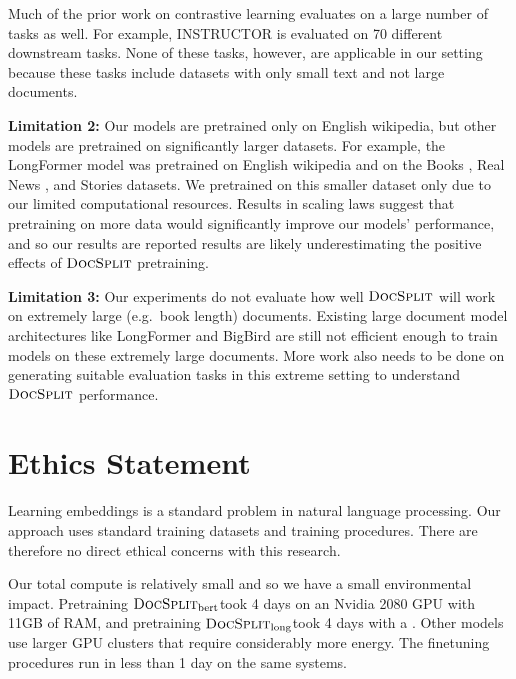 \documentclass[11pt]{article}
\newcommand{\our}{\mbox{\textsc{DocSplit}}}
\newcommand{\ourbert}{$\our_{\mathrm{bert}}$}
\newcommand{\ourlong}{$\our_{\mathrm{long}}$}
\newcommand{\fixme}[1]{{\color{red}{FIXME: {#1}}}}
\begin{document}
Much of the prior work on contrastive learning evaluates on a large number of tasks as well.
For example, INSTRUCTOR \cite{Su2022OneEA} is evaluated on 70 different downstream tasks.
None of these tasks, however, are applicable in our setting because these tasks include datasets with only small text and not large documents.

\textbf{Limitation 2:}
Our models are pretrained only on English wikipedia,
but other models are pretrained on significantly larger datasets.
For example, the LongFormer model was pretrained on English wikipedia and on the Books \citep{zhu2015aligning}, Real News \citep{zellers2019defending}, and Stories \citep{zellers2019defending} datasets.
We pretrained on this smaller dataset only due to our limited computational resources.
Results in scaling laws \citep{kaplan2020scaling} suggest that pretraining on more data would significantly improve our models' performance,
and so our results are reported results are likely underestimating the positive effects of $\our$ pretraining.

\textbf{Limitation 3:}
Our experiments do not evaluate how well $\our$ will work on extremely large (e.g.\ book length) documents.
Existing large document model architectures like LongFormer \cite{Beltagy2020LongformerTL} and BigBird \cite{Zaheer2020BigBT} are still not efficient enough to train models on these extremely large documents.
More work also needs to be done on generating suitable evaluation tasks in this extreme setting to understand $\our$ performance.

\section*{Ethics Statement}

Learning embeddings is a standard problem in natural language processing.
Our approach uses standard training datasets and training procedures.
There are therefore no direct ethical concerns with this research.

Our total compute is relatively small and so we have a small environmental impact.
Pretraining \ourbert took 4 days on an Nvidia 2080 GPU with 11GB of RAM,
and pretraining \ourlong took 4 days with a \fixme{GPU}.
Other models use larger GPU clusters that require considerably more energy.
The finetuning procedures run in less than 1 day on the same systems.
\end{document}
